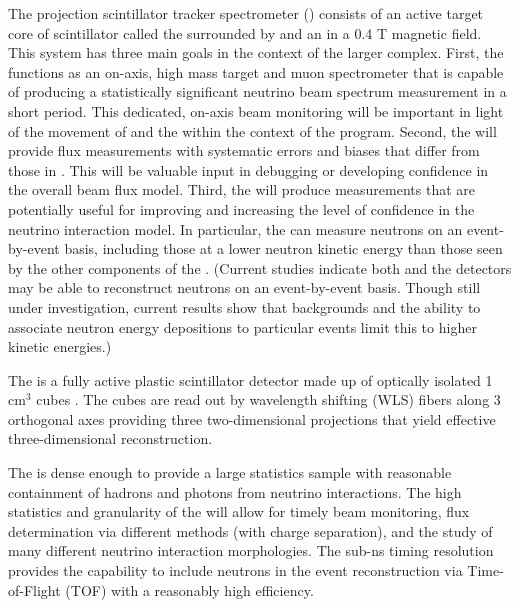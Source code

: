 The \threed projection scintillator tracker spectrometer () consists of an active target core of scintillator called the  surrounded by  and an  in a 0.4 T magnetic field.  This system has three main goals in the context of the larger  complex.  First, the  functions as an on-axis, high mass target and muon spectrometer that is capable of producing a statistically significant neutrino beam spectrum measurement in a short period.  This dedicated, on-axis beam monitoring will be important in light of the movement of  and the  within the context of the  program.  Second, the  will provide flux measurements with systematic errors and biases that differ from those in .  This will be valuable input in debugging or developing confidence in the overall beam flux model.  Third, the  will produce measurements that are potentially useful for improving and increasing the level of confidence in the neutrino interaction model. In particular, the  can measure neutrons on an event-by-event basis, including those at a lower neutron kinetic energy than those seen by the other components of the . (Current studies indicate both  and the  detectors may be able to reconstruct neutrons on an event-by-event basis.  Though still under investigation, current results show that backgrounds and the ability to associate neutron energy depositions to particular events limit this to higher kinetic energies.) 


The  is a fully active plastic scintillator detector made up of optically isolated 1 cm$^{3}$ cubes \cite{Sgalaberna:2017khy}.  The cubes are read out by wavelength shifting (WLS) fibers along 3 orthogonal axes providing three two-dimensional projections that yield effective three-dimensional reconstruction.  


The  is dense enough to provide a large statistics sample with reasonable containment of hadrons and photons from neutrino interactions. The high statistics and granularity  of the  will allow for timely beam monitoring, flux determination via different methods (with charge separation), and the study of many different neutrino interaction morphologies.  The sub-ns timing resolution provides the  capability to include neutrons in the event reconstruction via Time-of-Flight (TOF) with a reasonably high efficiency.  

